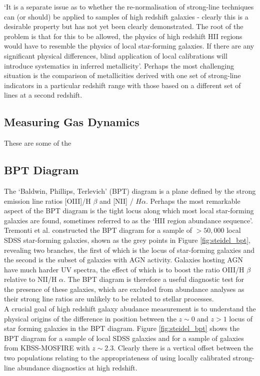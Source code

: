 \documentclass{literature}
\begin{document}
`It is a separate issue as to whether the re-normalisation of strong-line techniques can (or should) be applied to samples of high redshift galaxies - clearly this is a desirable property but has not yet been clearly demonstrated. The root of the problem is that for this to be allowed, the physics of high redshift HII regions would have to resemble the physics of local star-forming galaxies. If there are any significant physical differences, blind application of local calibrations will introduce systematics in inferred metallicity'. Perhaps the most challenging situation is the comparison of metallicities derived with one set of strong-line indicators in a particular redshift range with those based on a different set of lines at a second redshift. 




\subsection{Measuring Gas Dynamics}\label{subsec:Gas-Dynamics}

These are some of the 

\subsection{BPT Diagram}\label{subsec:BPT-diagram}
The `Baldwin, Phillips, Terlevich' (BPT) diagram is a plane defined by the strong emission line ratios [OIII]/H $\beta$ and [NII] / $H\alpha$. Perhaps the most remarkable aspect of the BPT diagram is the tight locus along which most local star-forming galaxies are found, sometimes referred to as the `HII region abundance sequence'. Tremonti et al. constructed the BPT diagram for a sample of $> 50,000$ local SDSS star-forming galaxies, shown as the grey points in Figure \ref{fig:steidel_bpt}, revealing two branches, the first of which is the locus of star-forming galaxies and the second is the subset of galaxies with AGN activity. Galaxies hosting AGN have much harder UV spectra, the effect of which is to boost the ratio OIII/H $\beta$ relative to NII/H $\alpha$. The BPT diagram is therefore a useful diagnostic test for the presence of these galaxies, which are excluded from abundance analyses as their strong line ratios are unlikely to be related to stellar processes. \\ 


A crucial goal of high redshift galaxy abudance measurement is to understand the physical origins of the difference in position between the $z \sim 0$ and $z > 1$ locus of star forming galaxies in the BPT diagram. Figure \ref{fig:steidel_bpt} shows the BPT diagram for a sample of local SDSS galaxies \citep{Tremonti2004} and for a sample of galaxies from KBSS-MOSFIRE with $z \sim 2.3$. Clearly there is a vertical offset between the two populations  
relating to the appropriateness of using locally calibrated strong-line abundance diagnostics at high redshift. 
\end{document}
